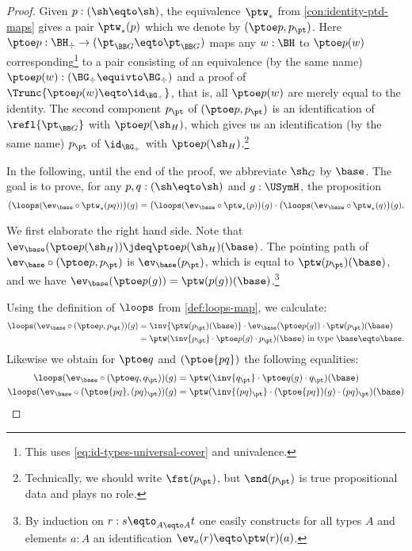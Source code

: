 \begin{proof}
Given $p:(\sh\eqto\sh)$, the equivalence $\ptw_*$ from 
\cref{con:identity-ptd-maps} gives a pair $\ptw_*(p)$ which
we denote by $(\ptoe p,p_\pt)$. Here 
$\ptoe p :\BH_\div\to(\pt_{\BB G}\eqto\pt_{\BB G})$ maps any $w:\BH$ to 
$\ptoe p(w)$ corresponding\footnote{%
This uses \cref{eq:id-types-universal-cover} and univalence.}
to a pair consisting of an equivalence (by the same name)
$\ptoe p(w):(\BG_\div\equivto\BG_\div)$ and a proof of
$\Trunc{\ptoe p(w) \eqto \id_{\BG_\div}}$, that is,
all $\ptoe p(w)$ are merely equal to the identity.
The second component $p_\pt$ of $(\ptoe p,p_\pt)$ is an
identification of $\refl{\pt_{\BB G}}$ with $\ptoe p(\sh_H)$,
which gives us an identification (by the same name) $p_\pt$ of 
$\id_{\BG_\div}$ with $\ptoe p(\sh_H)$.\footnote{%
Technically, we should write $\fst(p_\pt)$,
but $\snd(p_\pt)$ is true propositional data and plays no role.}

In the following, until the end of the proof,
we abbreviate $\sh_G$ by $\base$.
The goal is to prove, for any $p,q:(\sh\eqto\sh)$ and $g:\USymH$, 
the proposition
\[
\bigl(\loops(\ev_{\base}\circ \ptw_*(pq))\bigr)(g) = 
\bigl(\loops(\ev_{\base}\circ \ptw_*(p)\bigr)(g)\cdot
\bigl(\loops(\ev_{\base}\circ \ptw_*(q)\bigr)(g).
\]

We first elaborate the right hand side.
Note that $\ev_\base(\ptoe p(\sh_H))\jdeq \ptoe p(\sh_H)(\base)$. 
The pointing path of $\ev_{\base}\circ (\ptoe p,p_\pt)$
is $\ev_{\base}(p_\pt)$, which is equal to $\ptw(p_\pt)(\base)$,
and we have $\ev_{\base}(\ptoe p(g)) = \ptw(p(g))(\base)$.\footnote{%
By induction on $r: s \eqto_{A\eqto A} t$ one easily constructs for all
types $A$ and elements $a:A$ an identification $\ev_a(r) \eqto \ptw(r)(a)$.}

Using the definition of $\loops$ from \cref{def:loops-map},
we calculate:
\begin{align*}
\loops(\ev_{\base}\circ (\ptoe p,p_\pt))(g) &= 
\inv{\ptw(p_\pt)(\base)} \cdot \ev_{\base}(\ptoe p(g)) \cdot {\ptw(p_\pt)(\base)}\\
              &= 
\ptw (\inv{p_\pt} \cdot \ptoe p(g) \cdot p_\pt)(\base)
~\text{in type $\base\eqto\base$}.
\end{align*}
Likewise we obtain for $\ptoe q$ and $(\ptoe{pq})$ the following
equalities:
\begin{align*}
\loops(\ev_{\base}\circ (\ptoe q,q_\pt))(g) &=  
\ptw (\inv{q_\pt} \cdot \ptoe q(g) \cdot q_\pt)(\base)
\\
\loops(\ev_{\base}\circ (\ptoe {pq},(pq)_\pt))(g) &=  
\ptw (\inv{(pq)_\pt} \cdot (\ptoe{pq})(g) \cdot (pq)_\pt)(\base)
\end{align*}


\end{proof}

